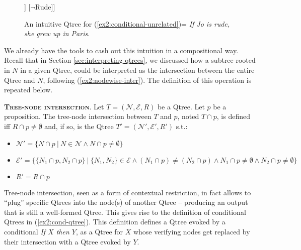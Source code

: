 \begin{figure}[H]
	\centering
	\begin{forest}
		[CS [Rude [Paris][Lyon][...][Berlin][...]] [$\neg$Rude]]
	\end{forest}
	\caption{An intuitive Qtree for (\ref{ex2:conditional-unrelated})= \textit{If Jo is rude, she grew up in Paris}.}\label{fig2:rude-paris-qtree}
\end{figure} 

We already have the tools to cash out this intuition in a compositional way. Recall that in Section \ref{sec:interpreting-qtrees}, we discussed how a subtree rooted in $N$ in a given Qtree, could be interpreted as the intersection between the entire Qtree and $N$, following (\ref{ex2:nodewise-inter}). The definition of this operation is repeated below.

\begin{exe}
	 {\textsc{\textbf{Tree-node intersection}}. Let $T=(\mathcal{N}, \mathcal{E}, R)$ be a Qtree. Let $p$ be a proposition. The tree-node intersection between $T$ and $p$, noted $T \cap p$, is defined iff $R \cap p \neq \emptyset$ and, if so, is the Qtree $T'=(\mathcal{N}', \mathcal{E}', R')$ s.t.:
		\begin{itemize}
			\item $\mathcal{N}' = \lbrace N \cap p \ | \ N \in \mathcal{N} \wedge N \cap p \neq \emptyset\rbrace$
			\item $\mathcal{E}' = \lbrace \lbrace N_1\cap p, N_2\cap p\rbrace \ | \ \lbrace N_1, N_2\rbrace \in \mathcal{E} \wedge (N_1\cap p) \neq (N_2\cap p) \wedge N_1\cap p \neq \emptyset \wedge N_2\cap p \neq \emptyset \rbrace$
			\item $R' = R\cap p$
	\end{itemize}}
\end{exe} 

Tree-node intersection, seen as a form of contextual restriction, in fact allows to ``plug'' specific Qtrees into the node(s) of another Qtree -- producing an output that is still a well-formed Qtree. This gives rise to the definition of conditional Qtrees in 
(\ref{ex2:cond-qtree}). This definition defines a Qtree evoked by a conditional \textit{If $X$ then $Y$}, as a Qtree for $X$ whose verifying nodes get replaced by their intersection with a Qtree evoked by $Y$. 

